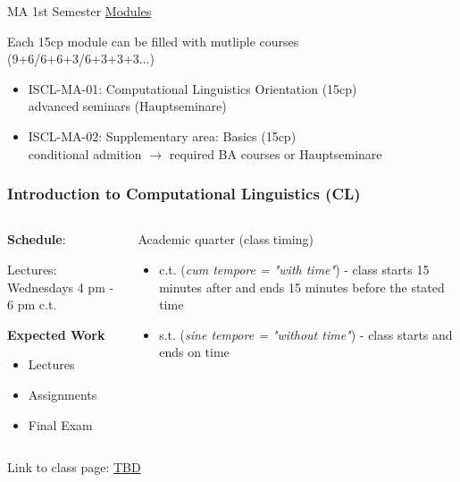 \documentclass[aspectratio=169,hyperref={unicode},xcolor={dvipsnames}]{beamer}
\begin{document}
\begin{frame}{MA 1st Semester \underline{Modules}}
	\begin{center}Each 15cp module can be filled with mutliple courses\\
	(9+6/6+6+3/6+3+3+3...)\end{center}
	
\begin{itemize}

	\item ISCL-MA-01: Computational Linguistics Orientation (15cp)
	\\advanced seminars (Hauptseminare)\\
	\item ISCL-MA-02: Supplementary area: Basics (15cp)\\conditional admition $\rightarrow$ required BA courses or Hauptseminare
\end{itemize}	
\end{frame}

\begin{frame}{}
\frametitle{Introduction to Computational Linguistics \hspace{5.5cm} (CL)}
\begin{columns}
	\begin{column}{0.5\linewidth}
		\textbf{Schedule}:
		
		Lectures: Wednesdays 4 pm - 6 pm c.t.
		\newline
		
		\textbf{Expected Work}
		\begin{itemize}
			\item Lectures
			\item Assignments
			\item Final Exam
		\end{itemize}

   	\end{column}
	\begin{column}{0.5\linewidth}
	\begin{alertblock}{Academic quarter (class timing)}
	\begin{itemize}
	 \item c.t. (\textit{cum tempore = "with time"}) - class starts 15 minutes after and ends 15 minutes before the stated time
	 \item s.t. (\textit{sine tempore = "without time"}) - class starts and ends on time
	 \end{itemize}
	 \end{alertblock}
	\end{column}
\end{columns}
\begin{center}
	Link to class page: \url{TBD}
\end{center}
\end{frame}
\end{document}
